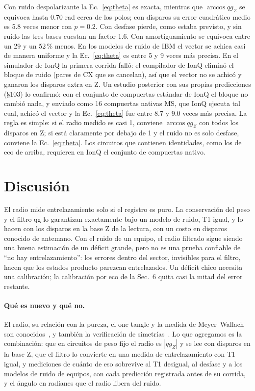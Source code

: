 \documentclass[11pt]{article}
\newcommand{\qZ}{qg_Z}
\begin{document}
Con ruido despolarizante la Ec.~\eqref{eq:theta} es exacta, mientras que $\arccos\qZ$ se equivoca hasta 0.70 rad cerca
de los polos; con disparos su error cuadrático medio es 5.8 veces menor con $p=0.2$. Con desfase pierde, como estaba
previsto, y sin ruido las tres bases cuestan un factor 1.6. Con amortiguamiento se equivoca entre un 29 y un 52\,\%
menos. En los modelos de ruido de IBM el vector se achica casi de manera uniforme y la Ec.~\eqref{eq:theta} es entre 5
y 9 veces más precisa. En el simulador de IonQ la primera corrida falló: el compilador de IonQ eliminó el bloque de
ruido (pares de CX que se cancelan), así que el vector no se achicó y ganaron los disparos extra en Z. Un estudio
posterior con sus propias predicciones (\S103) lo confirmó: con el conjunto de compuertas estándar de IonQ el bloque no
cambió nada, y enviado como 16 compuertas nativas MS, que IonQ ejecuta tal cual, achicó el vector y la
Ec.~\eqref{eq:theta} fue entre 8.7 y 9.0 veces más precisa. La regla es simple: si el radio medido es casi 1, conviene
$\arccos\qZ$ con todos los disparos en Z; si está claramente por debajo de 1 y el ruido no es solo desfase, conviene la
Ec.~\eqref{eq:theta}. Los circuitos que contienen identidades, como los de eco de arriba, requieren en IonQ el conjunto
de compuertas nativo.

\section{Discusión}

El radio mide entrelazamiento solo si el registro es puro. La conservación del peso y el filtro qg lo garantizan
exactamente bajo un modelo de ruido, T1 igual, y lo hacen con los disparos en la base Z de la lectura, con un costo en
disparos conocido de antemano. Con el ruido de un equipo, el radio filtrado sigue siendo una buena estimación de un
déficit grande, pero no es una prueba confiable de ``no hay entrelazamiento'': los errores dentro del sector, invisibles
para el filtro, hacen que los estados producto parezcan entrelazados. Un déficit chico necesita una calibración; la
calibración por eco de la Sec.~6 quita casi la mitad del error restante.

\paragraph{Qué es nuevo y qué no.} El radio, su relación con la pureza, el one-tangle y la medida de Meyer--Wallach son
conocidos~\cite{wootters1998,coffman2000,meyer2002,brennen2003}, y también la verificación de
simetrías~\cite{bonetmonroig2018,mcardle2019}. Lo que agregamos es la combinación: que en circuitos de peso fijo el radio
es $|\qZ|$ y se lee con disparos en la base Z, que el filtro lo convierte en una medida de entrelazamiento con T1 igual,
y mediciones de cuánto de eso sobrevive al T1 desigual, al desfase y a los modelos de ruido de equipos, con cada
predicción registrada antes de su corrida, y el ángulo en radianes que el radio libera del ruido.
\end{document}
